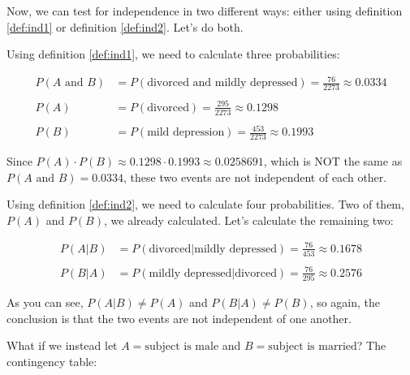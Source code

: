\documentclass[]{book}
\theoremstyle{definition}
\theoremstyle{definition}
\theoremstyle{definition}
\theoremstyle{remark}
\begin{document}
Now, we can test for independence in two different ways: either using definition \ref{def:ind1} or definition \ref{def:ind2}. Let's do both.

Using definition \ref{def:ind1}, we need to calculate three probabilities:

\begin{align*}
  P(A \text{ and } B) &= P(\text{divorced and mildly depressed}) = \frac{76}{2273} \approx 0.0334 \\
  & \\
  P(A) &= P(\text{divorced}) = \frac{295}{2273} \approx 0.1298 \\
  & \\
  P(B) &= P(\text{mild depression}) = \frac{453}{2273} \approx 0.1993
\end{align*}

Since \(P(A)\cdot P(B) \approx 0.1298 \cdot 0.1993 \approx 0.0258691\), which is NOT the same as \(P(A \text{ and } B) = 0.0334\), these two events are not independent of each other.

Using definition \ref{def:ind2}, we need to calculate four probabilities. Two of them, \(P(A)\) and \(P(B)\), we already calculated. Let's calculate the remaining two:

\begin{align*}
  P(A | B) &= P(\text{divorced} | \text{mildly depressed}) = \frac{76}{453} \approx 0.1678\\
  & \\
  P(B | A) &= P(\text{mildly depressed} | \text{divorced}) = \frac{76}{295} \approx 0.2576
\end{align*}

As you can see, \(P(A | B) \neq P(A)\) and \(P(B | A) \neq P(B)\), so again, the conclusion is that the two events are not independent of one another.

What if we instead let \(A = \text{subject is male}\) and \(B = \text{subject is married}\)? The contingency table:
\end{document}
